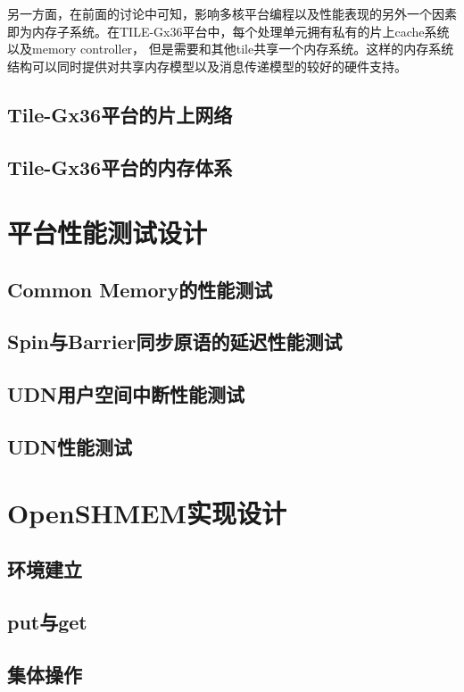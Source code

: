 另一方面，在前面的讨论中可知，影响多核平台编程以及性能表现的另外一个因素即为内存子系统。在TILE-Gx36平台中，每个处理单元拥有私有的片上cache系统以及memory controller， 但是需要和其他tile共享一个内存系统。这样的内存系统结构可以同时提供对共享内存模型以及消息传递模型的较好的硬件支持。
\subsection{Tile-Gx36平台的片上网络}
\subsection{Tile-Gx36平台的内存体系}

\section{平台性能测试设计}
\subsection{Common Memory的性能测试}
\subsection{Spin与Barrier同步原语的延迟性能测试}
\subsection{UDN用户空间中断性能测试}
\subsection{UDN性能测试}

\section{OpenSHMEM实现设计}
\subsection{环境建立}
\subsection{put与get}
\subsection{集体操作}